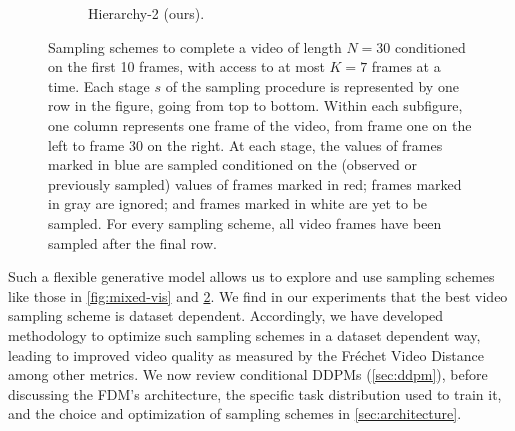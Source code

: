 \begin{figure}[t!]
\begin{subfigure}[t]{0.24\textwidth}
        \caption{Hierarchy-2 (ours).} \label{fig:hierarchy-vis}
    \end{subfigure}%
    \caption{Sampling schemes to complete a video of length $N=30$ conditioned on the first 10 frames, with access to at most $K=7$ frames at a time. Each stage $s$ of the sampling procedure is represented by one row in the figure, going from top to bottom. Within each subfigure, one column represents one frame of the video, from frame one on the left to frame 30 on the right. At each stage, the values of frames marked in blue are sampled conditioned on the (observed or previously sampled) values of frames marked in red; frames marked in gray are ignored; and frames marked in white are yet to be sampled. For every sampling scheme, all video frames have been sampled after the final row.
    }
\end{figure}


Such a flexible generative model allows us to explore and use sampling schemes like those in \cref{fig:mixed-vis} and \cref{fig:hierarchy-vis}.  We find in our experiments that the best video sampling scheme is dataset dependent. Accordingly, we have developed methodology to optimize such sampling schemes in a dataset dependent way, leading to improved video quality as measured by the Fréchet Video Distance~\cite{unterthiner2018towards} among other metrics. We now review conditional DDPMs (\cref{sec:ddpm}), before discussing the FDM's architecture, the specific task distribution  used to train it, and the choice and optimization of sampling schemes in \cref{sec:architecture}.

